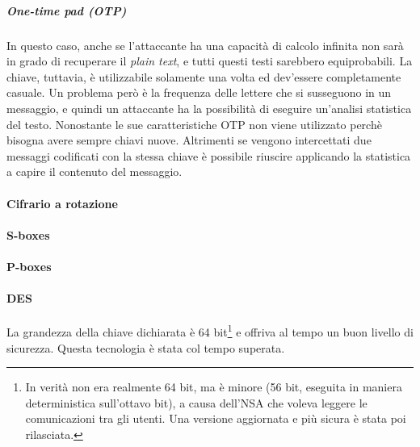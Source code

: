 \subparagraph*{One-time pad (OTP)}
In questo caso, anche se l'attaccante ha una capacità di calcolo infinita non 
sarà in grado di recuperare il \textit{plain text}, e tutti questi testi 
sarebbero equiprobabili. 
La chiave, tuttavia, è utilizzabile solamente una volta ed dev'essere 
completamente casuale.
Un problema però è la frequenza delle lettere che si susseguono in un messaggio, 
e quindi un attaccante ha la possibilità di eseguire un'analisi statistica del 
testo.
Nonostante le sue caratteristiche OTP non viene utilizzato perchè bisogna avere 
sempre chiavi nuove. Altrimenti se vengono intercettati due messaggi codificati 
con la stessa chiave è possibile riuscire applicando la statistica a capire il 
contenuto del messaggio.


\paragraph{Cifrario a rotazione}


\paragraph{S-boxes}


\paragraph{P-boxes}


\paragraph{DES}


La grandezza della chiave dichiarata è 64 bit\footnote{In verità non era 
realmente 64 bit, ma è minore (56 bit, eseguita in maniera deterministica 
sull'ottavo bit), a causa dell'NSA che voleva leggere le comunicazioni tra gli 
utenti. Una versione aggiornata e più sicura è stata poi rilasciata.} e offriva 
al tempo un buon livello di sicurezza. Questa tecnologia è stata col tempo 
superata.

